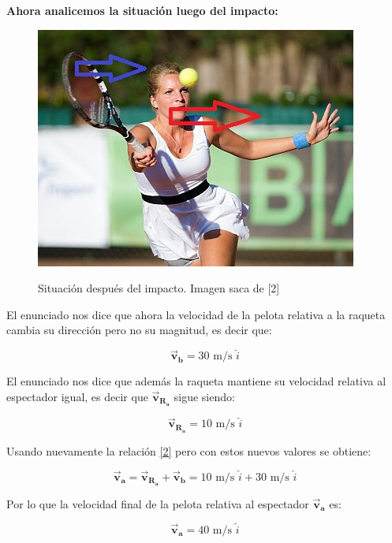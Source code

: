 \documentclass[a4paper,11pt]{article}
\theoremstyle{mytheor}
\begin{document}
\huge \textbf{Ahora analicemos la situación luego del impacto:} \normalsize


\begin{figure}[h]
	\includegraphics[width=1.0\linewidth]{./im/ten2}
	\label{fcN4}
	\caption{Situación después del impacto. Imagen saca de [2]}
\end{figure}

El enunciado nos dice que ahora la velocidad de la pelota relativa a la raqueta cambia su dirección pero no su magnitud, es decir que:

 $$\vec{\textbf{v}}_{\textbf{b}} = 30  \text{ m/s } \hat{i} $$

El enunciado nos dice que además la raqueta mantiene su velocidad relativa al espectador igual, es decir que $\vec{\textbf{v}}_{\textbf{R}_\textbf{a}}$ sigue siendo:

$$ \vec{\textbf{v}}_{\textbf{R}_\textbf{a}} = 10 \text{ m/s } \hat{i} $$

Usando nuevamente la relación \ref{2} pero con estos nuevos valores se obtiene:



\begin{equation}
\vec{\textbf{v}}_{\textbf{a}} = \vec{\textbf{v}}_{\textbf{R}_\textbf{a}} + \vec{\textbf{v}}_{\textbf{b}} = 10 \text{ m/s } \hat{i} + 30 \text{ m/s } \hat{i}
\end{equation}

Por lo que la velocidad final de la pelota relativa al espectador $\vec{\textbf{v}}_{\textbf{a}}$ es:

\begin{equation}
 \vec{\textbf{v}}_{\textbf{a}} =  40 \text{ m/s } \hat{i} 
\end{equation}
\end{document}
